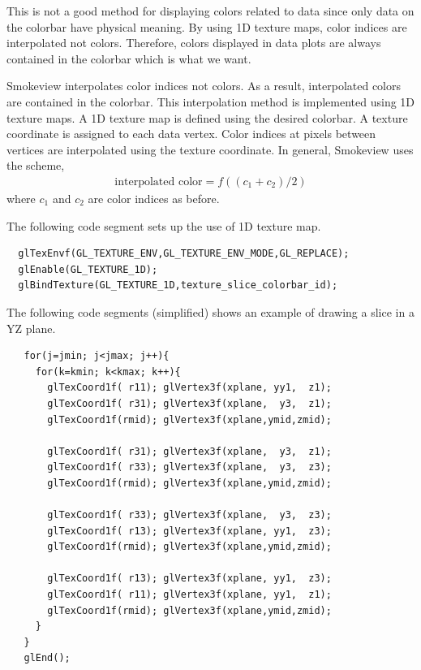 \documentclass[11pt,twoside]{book}
\begin{document}
This is not a good method for displaying colors related to data
since only data on the colorbar have physical meaning.  By using
1D texture maps, color indices are interpolated not colors.
Therefore, colors displayed in data plots are always contained in
the colorbar which is what we want.

Smokeview interpolates color indices not colors. As a
result, interpolated colors are contained in the colorbar.  This
interpolation method is implemented using 1D texture maps.  A 1D
texture map is defined using the desired colorbar.  A texture
coordinate is assigned to each data vertex.    Color indices at
pixels between vertices are interpolated using the texture
coordinate.  In general, Smokeview uses the scheme,
\begin{eqnarray*}
\mbox{interpolated color}=f((c_1+c_2)/2)
\end{eqnarray*}
where $c_1$ and $c_2$ are color indices as before.

The following code segment sets up the use of 1D texture map.

\begin{verbatim}
  glTexEnvf(GL_TEXTURE_ENV,GL_TEXTURE_ENV_MODE,GL_REPLACE);
  glEnable(GL_TEXTURE_1D);
  glBindTexture(GL_TEXTURE_1D,texture_slice_colorbar_id);
\end{verbatim}

The following code segments (simplified) shows an example of drawing a slice in a YZ plane.

\begin{verbatim}
   for(j=jmin; j<jmax; j++){
     for(k=kmin; k<kmax; k++){
       glTexCoord1f( r11); glVertex3f(xplane, yy1,  z1);
       glTexCoord1f( r31); glVertex3f(xplane,  y3,  z1);
       glTexCoord1f(rmid); glVertex3f(xplane,ymid,zmid);

       glTexCoord1f( r31); glVertex3f(xplane,  y3,  z1);
       glTexCoord1f( r33); glVertex3f(xplane,  y3,  z3);
       glTexCoord1f(rmid); glVertex3f(xplane,ymid,zmid);

       glTexCoord1f( r33); glVertex3f(xplane,  y3,  z3);
       glTexCoord1f( r13); glVertex3f(xplane, yy1,  z3);
       glTexCoord1f(rmid); glVertex3f(xplane,ymid,zmid);

       glTexCoord1f( r13); glVertex3f(xplane, yy1,  z3);
       glTexCoord1f( r11); glVertex3f(xplane, yy1,  z1);
       glTexCoord1f(rmid); glVertex3f(xplane,ymid,zmid);
     }
   }
   glEnd();
\end{verbatim}
\end{document}
